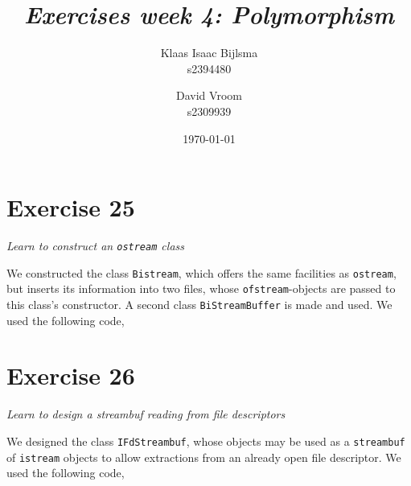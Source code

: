\documentclass[12pt]{article}
\title{\itshape Exercises week 4: Polymorphism}
\author{
	Klaas Isaac Bijlsma \\ s2394480
	\and
	David Vroom \\ s2309939
}
\date{\today}
\newcommand{\desc}[1]{\textit{#1} \vspace{1em}}
\begin{document}
\maketitle

\section*{Exercise 25}
\desc{Learn to construct an \texttt{ostream} class}

We constructed the class \texttt{Bistream}, which offers the same facilities as \texttt{ostream}, but inserts its information into two files, whose \texttt{ofstream}-objects are passed to this class's constructor. A second class \texttt{BiStreamBuffer} is made and used. We used the following code,









\clearpage

\section*{Exercise 26}
\desc{Learn to design a streambuf reading from file descriptors}

We designed the class \texttt{IFdStreambuf}, whose objects may be used as a \texttt{streambuf} of \texttt{istream} objects to allow extractions from an already open file descriptor. We used the following code,










\end{document}
